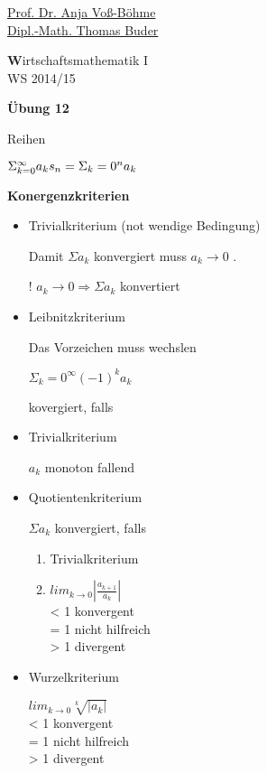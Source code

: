 \documentclass[12pt,a4paper]{scrreprt}
\begin{document}
 
\begin{flushleft}
\href{mailto:anja.voss-boehme@htw-dresden.de}{Prof. Dr. Anja Voß-Böhme} \\
\href{mailto:buder@htw-dresden.de}{Dipl.-Math. Thomas Buder}
\end{flushleft}

\begin{center}{\large\textbf Wirtschaftsmathematik I} \\ WS 2014/15 \end{center}

\begin{center}{\large\textbf{Übung 12}} 
\end{center}


\bigskip

Reihen

$\Sigma_{k=0}^{\infty} a_k	\\
s_n = \Sigma_k=0^n a_k$

\textbf{Konergenzkriterien}

\begin{itemize}

\item Trivialkriterium (not wendige Bedingung)

Damit $\Sigma a_k$ konvergiert muss $a_k \rightarrow 0$ .

! $a_k \rightarrow 0 \Rightarrow \Sigma a_k$ konvertiert

\item Leibnitzkriterium

Das Vorzeichen muss wechslen

$\Sigma_k=0^\infty (-1)^k a_k $

kovergiert, falls

\item Trivialkriterium

$a_k$ monoton fallend

\item Quotientenkriterium

$\Sigma a_k$ konvergiert, falls

\begin{enumerate}
\item Trivialkriterium
\item $lim_{k \rightarrow 0} |\frac{a_{k+1}}{a_k}|$ \\
< 1 konvergent	\\
= 1 nicht hilfreich	\\
> 1 divergent	
\end{enumerate}

\item Wurzelkriterium

$lim_{k \rightarrow 0} \sqrt[k]{|a_k|}$ \\
< 1 konvergent	\\
= 1 nicht hilfreich	\\
> 1 divergent

\end{itemize}
\end{document}
